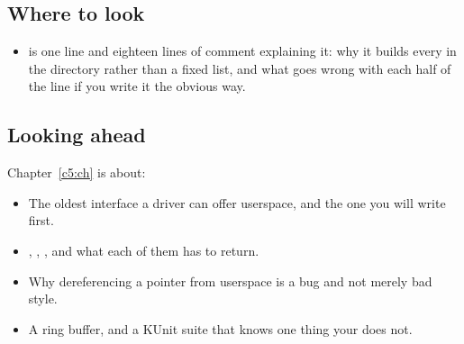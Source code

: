 \subsection*{Where to look}
\begin{itemize}
  \item {} is one line and eighteen lines of comment explaining it: why
    it builds every  in the directory rather than a fixed list, and what goes wrong with
    each half of the line if you write it the obvious way.
\end{itemize}

\subsection*{Looking ahead}
Chapter~\ref{c5:ch} is about:
\begin{itemize}
  \item The oldest interface a driver can offer userspace, and the one you will write first.
  \item {}, , , and what each of them has to return.
  \item Why dereferencing a pointer from userspace is a bug and not merely bad style.
  \item A ring buffer, and a KUnit suite that knows one thing your  does not.
\end{itemize}
